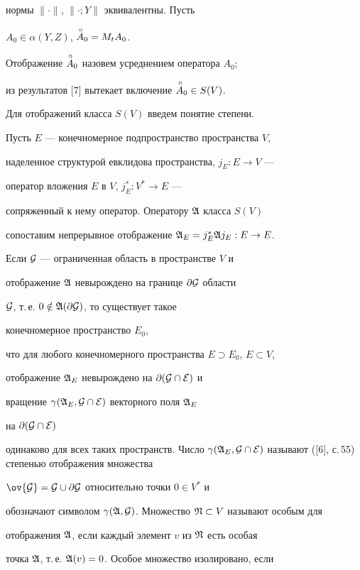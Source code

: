 нормы $\|\cdot\|$, $\|\cdot;Y\|$ эквивалентны. Пусть 


$A_0\in \alpha(Y,Z)$, $\overset{\,\circ}{A}{}_0=M_t A_0$. 


Отображение $\overset{\,\circ}{A}{}_0$ назовем усреднением оператора $A_0$; 


из результатов [7] вытекает включение $\overset{\,\circ}{A}{}_0\in S(V)$. 


 


Для отображений класса $S(V)$ введем понятие степени. 


Пусть $E$ --- конечномерное подпространство пространства $V$, 


наделенное структурой евклидова пространства, $j_E:E\to V$ --- 


оператор вложения $E$ в $V$, $j^*_E:V^*\to E$ --- 


сопряженный к нему оператор. Оператору $\frak A$ класса $S(V)$ 


сопоставим непрерывное отображение $\frak A_E=j^*_E\frak A j_E:E\to E$. 


Если $\cal G$ --- ограниченная область в пространстве $V$ и 


отображение $\frak A$ невырождено на границе $\partial\cal G$ области 


$\cal G$, т.\,е. $0\notin\frak A(\partial\cal G)$, то существует такое 


конечномерное пространство $E_0$, 


что для любого конечномерного пространства $E\supset E_0$, $E\subset V$, 


отображение $\frak A_E$ невырождено на $\partial(\cal G\cap E)$ и 


вращение $\gamma(\frak A_E,\cal G\cap E)$ векторного поля $\frak A_E$ 


на $\partial(\cal G\cap E)$ 


одинаково для всех таких пространств. Число $\gamma(\frak A_E,\cal 


G\cap E)$ называют ([6], с.\,55) степенью отображения множества 


$\ov{\cal G}=\cal G\cup\partial\cal G$ относительно точки $0\in V^*$ и 


обозначают символом $\gamma(\frak A,\cal G)$. Множество $\frak N\subset 


V$ называют особым для 


отображения $\frak A$, если каждый элемент $v$ из $\frak N$ есть особая 


точка $\frak A$, т.\,е. $\frak A(v)=0$. Особое множество изолировано, если 


